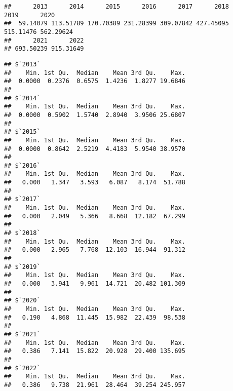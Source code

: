 \documentclass[
]{article}
\newenvironment{Shaded}{\begin{snugshade}}{\end{snugshade}}
\newcommand{\AttributeTok}[1]{\textcolor[rgb]{0.13,0.29,0.53}{#1}}
\newcommand{\ConstantTok}[1]{\textcolor[rgb]{0.56,0.35,0.01}{#1}}
\newcommand{\FunctionTok}[1]{\textcolor[rgb]{0.13,0.29,0.53}{\textbf{#1}}}
\newcommand{\NormalTok}[1]{#1}
\newcommand{\SpecialCharTok}[1]{\textcolor[rgb]{0.81,0.36,0.00}{\textbf{#1}}}
\begin{document}
\begin{Shaded}
\end{Shaded}

\begin{verbatim}
##      2013      2014      2015      2016      2017      2018      2019      2020 
##  59.14079 113.51789 170.70389 231.28399 309.07842 427.45095 515.11476 562.29624 
##      2021      2022 
## 693.50239 915.31649
\end{verbatim}

\begin{Shaded}
\end{Shaded}

\begin{verbatim}
## $`2013`
##    Min. 1st Qu.  Median    Mean 3rd Qu.    Max. 
##  0.0000  0.2376  0.6575  1.4236  1.8277 19.6846 
## 
## $`2014`
##    Min. 1st Qu.  Median    Mean 3rd Qu.    Max. 
##  0.0000  0.5902  1.5740  2.8940  3.9506 25.6807 
## 
## $`2015`
##    Min. 1st Qu.  Median    Mean 3rd Qu.    Max. 
##  0.0000  0.8642  2.5219  4.4183  5.9540 38.9570 
## 
## $`2016`
##    Min. 1st Qu.  Median    Mean 3rd Qu.    Max. 
##   0.000   1.347   3.593   6.087   8.174  51.788 
## 
## $`2017`
##    Min. 1st Qu.  Median    Mean 3rd Qu.    Max. 
##   0.000   2.049   5.366   8.668  12.182  67.299 
## 
## $`2018`
##    Min. 1st Qu.  Median    Mean 3rd Qu.    Max. 
##   0.000   2.965   7.768  12.103  16.944  91.312 
## 
## $`2019`
##    Min. 1st Qu.  Median    Mean 3rd Qu.    Max. 
##   0.000   3.941   9.961  14.721  20.482 101.309 
## 
## $`2020`
##    Min. 1st Qu.  Median    Mean 3rd Qu.    Max. 
##   0.190   4.868  11.445  15.982  22.439  98.538 
## 
## $`2021`
##    Min. 1st Qu.  Median    Mean 3rd Qu.    Max. 
##   0.386   7.141  15.822  20.928  29.400 135.695 
## 
## $`2022`
##    Min. 1st Qu.  Median    Mean 3rd Qu.    Max. 
##   0.386   9.738  21.961  28.464  39.254 245.957
\end{verbatim}
\end{document}
